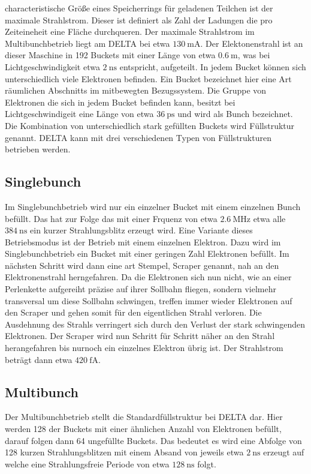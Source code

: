characteristische Größe eines Speicherrings für geladenen Teilchen ist der maximale Strahlstrom. Dieser 
ist definiert als Zahl der Ladungen die pro Zeiteineheit eine Fläche durchqueren.
Der maximale Strahlstrom im Multibunchbetrieb liegt am DELTA bei etwa $\SI{130}{\milli\ampere}$.
Der Elektonenstrahl ist an dieser Maschine in 192 Buckets mit einer Länge von etwa $\SI{0,6}{\meter}$, 
was bei Lichtgeschwindigkeit etwa $\SI{2}{\nano\second}$ entspricht, aufgeteilt. In jedem Bucket können 
sich unterschiedlich viele Elektronen befinden. Ein Bucket bezeichnet hier eine Art räumlichen Abschnitts 
im mitbewegten Bezugssystem. Die Gruppe von Elektronen die sich in jedem Bucket befinden kann, besitzt 
bei Lichtgeschwindigeit eine Länge von etwa $\SI{36}{\pico\second}$ und wird als Bunch bezeichnet. Die 
Kombination von unterschiedlich stark gefüllten Buckets wird Füllstruktur genannt. DELTA kann mit drei 
verschiedenen Typen von Füllstrukturen betrieben werden.

\subsection{Singlebunch}
\label{sec:Singlebunch}
Im Singlebunchbetrieb wird nur ein einzelner Bucket mit einem einzelnen Bunch befüllt. Das hat zur Folge
das mit einer Frquenz von etwa $\SI{2,6}{\mega\hertz}$ etwa alle $\SI{384}{\nano\second}$ ein kurzer 
Strahlungsblitz erzeugt wird. Eine Variante dieses Betriebsmodus ist der Betrieb mit einem einzelnen
Elektron. Dazu wird im Singlebunchbetrieb ein Bucket mit einer geringen Zahl Elektronen befüllt. Im 
nächsten Schritt wird dann eine art Stempel, Scraper genannt, nah an den Elektronenstrahl herngefahren.
Da die Elektronen sich nun nicht, wie an einer Perlenkette aufgereiht präzise auf ihrer Sollbahn fliegen,
sondern vielmehr transversal um diese Sollbahn schwingen, treffen immer wieder Elektronen auf den Scraper
und gehen somit für den eigentlichen Strahl verloren. Die Ausdehnung des Strahls verringert sich durch den 
Verlust der stark schwingenden Elektronen. Der Scraper wird nun Schritt für Schritt näher an den Strahl 
herangefahren bis nurnoch ein einzelnes Elektron übrig ist. Der Strahlstrom beträgt dann etwa
$\SI{420}{\femto\ampere}$.

\subsection{Multibunch}
\label{Multibunch}
Der Multibunchbetrieb stellt die Standardfüllstruktur bei DELTA dar. Hier werden 128 der Buckets mit 
einer ähnlichen Anzahl von Elektronen befüllt, darauf folgen dann 64 ungefüllte Buckets. Das bedeutet es 
wird eine Abfolge von 128 kurzen Strahlungsblitzen mit einem Absand von jeweils etwa 
$\SI{2}{\nano\second}$ erzeugt auf welche eine Strahlungsfreie Periode von etwa $\SI{128}{\nano\second}$
folgt.

